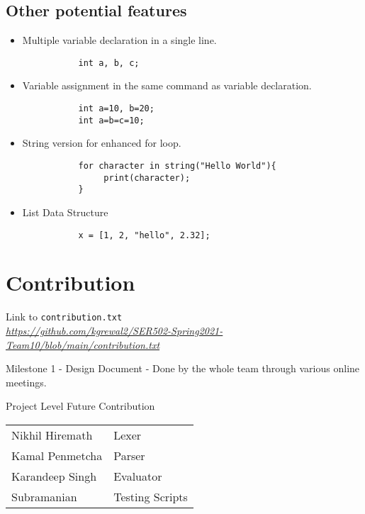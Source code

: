\documentclass[12pt,letterpaper]{article}
\begin{document}
\subsection{Other potential features}
\begin{itemize}
    \item Multiple variable declaration in a single line.
        \begin{verbatim}
           int a, b, c;
        \end{verbatim}
    \item Variable assignment in the same command as variable declaration.
        \begin{verbatim}
           int a=10, b=20;
           int a=b=c=10;
        \end{verbatim}

    \item String version for enhanced for loop.
        \begin{verbatim}
           for character in string("Hello World"){
                print(character);
           }
        \end{verbatim}

    \item List Data Structure
        \begin{verbatim}
           x = [1, 2, "hello", 2.32];
        \end{verbatim}
\end{itemize}

\section{Contribution}
Link to \texttt{contribution.txt}\\
\href{https://github.com/kgrewal2/SER502-Spring2021-Team10/blob/main/contribution.txt}{\textit{https://github.com/kgrewal2/SER502-Spring2021-Team10/blob/main/contribution.txt}}

Milestone 1
- Design Document - Done by the whole team through various online meetings.

Project Level Future Contribution\\
\begin{tabular}{ll}
    Nikhil Hiremath & Lexer\\
    Kamal Penmetcha & Parser\\
    Karandeep Singh & Evaluator\\
    Subramanian     & Testing Scripts
\end{tabular}
\end{document}
